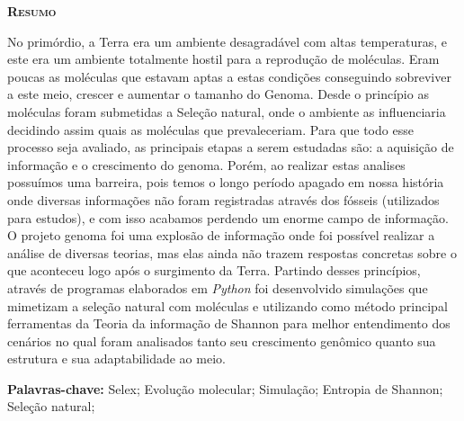 \begin{center}
\textsc{\textbf{\Large Resumo }}
\end{center}

No primórdio, a Terra era um ambiente desagradável com altas
temperaturas, e este era um ambiente totalmente hostil para a reprodução de
moléculas. Eram poucas as moléculas que estavam aptas a estas condições
conseguindo sobreviver a este meio, crescer e aumentar o tamanho do Genoma.
Desde o princípio as moléculas foram submetidas a Seleção natural, onde o
ambiente as influenciaria decidindo assim quais as moléculas que
prevaleceriam. Para que todo esse processo seja avaliado, as principais etapas
a serem estudadas são: a aquisição de informação e o crescimento do genoma.
Porém, ao realizar estas analises possuímos uma barreira, pois temos o longo
período apagado em nossa história onde diversas informações não foram
registradas através dos fósseis (utilizados para estudos), e com isso acabamos
perdendo um enorme campo de informação. O projeto genoma foi uma explosão
de informação onde foi possível realizar a análise de diversas teorias, mas elas
ainda não trazem respostas concretas sobre o que aconteceu logo após o
surgimento da Terra. Partindo desses princípios, através de programas
elaborados em \emph{Python} foi desenvolvido simulações que mimetizam a seleção
natural com moléculas e utilizando como método principal ferramentas da Teoria
da informação de Shannon para melhor entendimento dos cenários no qual
foram analisados tanto seu crescimento genômico quanto sua estrutura e sua
adaptabilidade ao meio.

\vspace{1cm}

\noindent\textbf{Palavras-chave:} Selex; Evolução molecular; Simulação; Entropia de Shannon;
Seleção natural;
